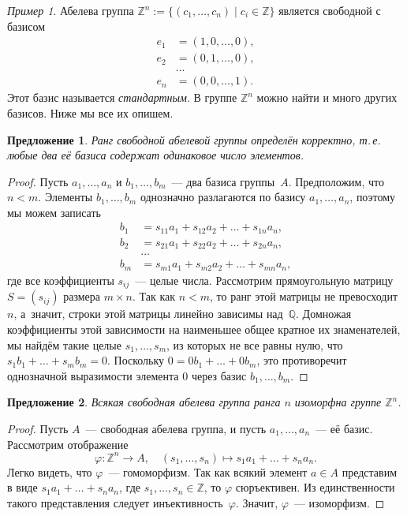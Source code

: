 \documentclass[a4paper,10pt]{amsart}
\def\ZZ{{\mathbb Z}}%
\def\QQ{{\mathbb Q}}%
\newtheorem{proposition}{Предложение}
\theoremstyle{definition}
\theoremstyle{remark}
\newtheorem{example}{Пример}
\begin{document}
\begin{example}
Абелева группа $\ZZ^n:=\{(c_1,\ldots,c_n) \mid c_i\in\ZZ\}$ является
свободной с базисом
$$
\begin{aligned}
e_1 &= (1,0,\ldots,0), \\
e_2 &= (0,1,\ldots,0),\\
 &\ldots \\
e_n &= (0,0,\ldots,1).
\end{aligned}
$$
Этот базис называется {\it стандартным}. В группе $\ZZ^n$ можно
найти и много других базисов. Ниже мы все их опишем.
\end{example}

\begin{proposition}
Ранг свободной абелевой группы определён корректно, т.\,е. любые два
её базиса содержат одинаковое число элементов.
\end{proposition}

\begin{proof}
Пусть $a_1, \ldots, a_n$ и $b_1, \ldots, b_m$~--- два базиса
группы~$A$. Предположим, что $n < m$. Элементы $b_1, \ldots, b_m$
однозначно разлагаются по базису $a_1, \ldots, a_n$, поэтому мы
можем записать
$$
\begin{aligned}
b_1 &= s_{11}a_1 + s_{12}a_2 + \ldots + s_{1n}a_n, \\
b_2 &= s_{21}a_1 + s_{22}a_2 + \ldots + s_{2n}a_n,\\
 &\ldots \\
b_m &= s_{m1}a_1 + s_{m2}a_2 + \ldots + s_{mn}a_n,
\end{aligned}
$$
где все коэффициенты $s_{ij}$~--- целые числа. Рассмотрим
прямоугольную матрицу $S = (s_{ij})$ размера $m \times n$. Так как
$n < m$, то ранг этой матрицы не превосходит~$n$, а~значит, строки
этой матрицы линейно зависимы над~$\QQ$. Домножая коэффициенты этой
зависимости на наименьшее общее кратное их знаменателей, мы найдём
такие целые $s_1, \ldots, s_m$, из которых не все равны нулю, что
$s_1 b_1 + \ldots + s_m b_m=0$. Поскольку $0 = 0b_1 + \ldots +
0b_m$, это противоречит однозначной выразимости элемента $0$ через
базис $b_1, \ldots, b_m$.
\end{proof}

\begin{proposition}
Всякая свободная абелева группа ранга $n$ изоморфна группе $\ZZ^n$.
\end{proposition}

\begin{proof}
Пусть $A$~--- свободная абелева группа, и пусть $a_1,\ldots,a_n$~---
её базис. Рассмотрим отображение
$$\varphi \colon \ZZ^n \to A, \quad (s_1, \ldots, s_n)
\mapsto s_1a_1 + \ldots + s_na_n.
$$
Легко видеть, что $\varphi$~--- гомоморфизм. Так как всякий элемент
$a \in A$ представим в виде $s_1a_1 + \ldots + s_na_n$, где $s_1,
\ldots, s_n \in \ZZ$, то $\varphi$ сюръективен. Из единственности
такого представления следует инъективность~$\varphi$. Значит,
$\varphi$~--- изоморфизм.
\end{proof}
\end{document}
